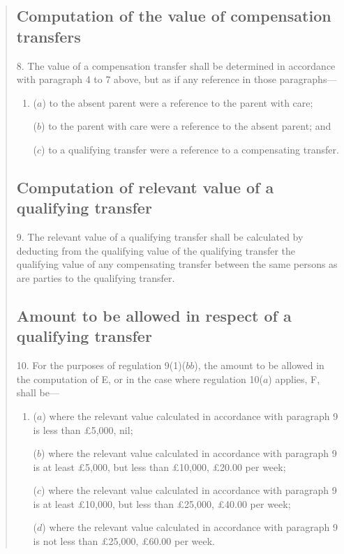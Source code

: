 \documentclass[12pt,a4paper]{article}
\begin{document}
\begin{quotation}
\subsection*{Computation of the value of compensation transfers}

8.  The value of a compensation transfer shall be determined in accordance with paragraph 4 to 7 above, but as if any reference in those paragraphs—
\begin{enumerate}\item[]
($a$) to the absent parent were a reference to the parent with care;

($b$) to the parent with care were a reference to the absent parent; and

($c$) to a qualifying transfer were a reference to a compensating transfer.
\end{enumerate}

\subsection*{\sloppy Computation of relevant value of a qualifying transfer}

9.  The relevant value of a qualifying transfer shall be calculated by deducting from the qualifying value of the qualifying transfer the qualifying value of any compensating transfer between the same persons as are parties to the qualifying transfer.

\subsection*{Amount to be allowed in respect of a qualifying transfer}

10.  For the purposes of regulation 9(1)($bb$), the amount to be allowed in the computation of E, or in the case where regulation 10($a$) applies, F, shall be—
\begin{enumerate}\item[]
($a$) where the relevant value calculated in accordance with paragraph 9 is less than £5,000, nil;

($b$) where the relevant value calculated in accordance with paragraph 9 is at least £5,000, but less than £10,000, £20.00 per week;

($c$) where the relevant value calculated in accordance with paragraph 9 is at least £10,000, but less than £25,000, £40.00 per week;

($d$) where the relevant value calculated in accordance with paragraph 9 is not less than £25,000, £60.00 per week.
\end{enumerate}


\end{quotation}
\end{document}
